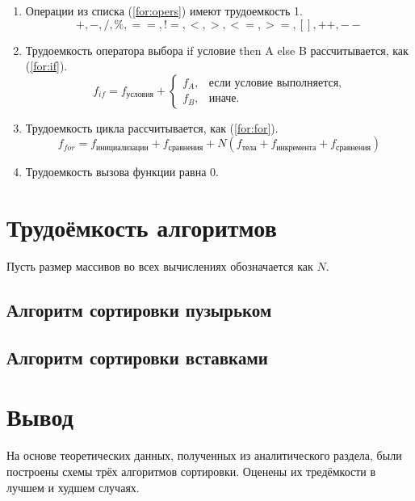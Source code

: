 \documentclass[12pt]{report}
\begin{document}
\begin{enumerate}
	\item Операции из списка (\ref{for:opers}) имеют трудоемкость 1.
	\begin{equation}
	\label{for:opers}
	+, -, /, \%, ==, !=, <, >, <=, >=, [], ++, {-}-
	\end{equation}
	\item Трудоемкость оператора выбора if условие then A else B рассчитывается, как (\ref{for:if}).
	\begin{equation}
	\label{for:if}
	f_{if} = f_{\text{условия}} +
	\begin{cases}
	f_A, & \text{если условие выполняется,}\\
	f_B, & \text{иначе.}
	\end{cases}
	\end{equation}
	\item Трудоемкость цикла рассчитывается, как (\ref{for:for}).
	\begin{equation}
	\label{for:for}
	f_{for} = f_{\text{инициализации}} + f_{\text{сравнения}} + N(f_{\text{тела}} + f_{\text{инкремента}} + f_{\text{сравнения}})
	\end{equation}
	\item Трудоемкость вызова функции равна 0.
\end{enumerate}

\section{Трудоёмкость алгоритмов}

Пусть размер массивов во всех вычислениях обозначается как $N$.

\subsection{Алгоритм сортировки пузырьком}

\subsection{Алгоритм сортировки вставками}

\section{Вывод}

На основе теоретических данных, полученных из аналитического раздела, были построены схемы трёх алгоритмов сортировки. Оценены их тредёмкости в лучшем и худшем случаях.
\end{document}
